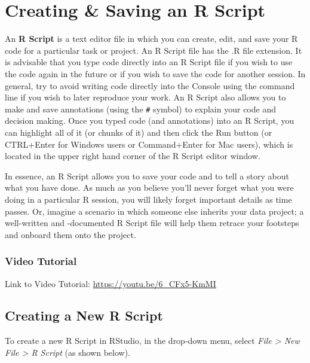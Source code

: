 \documentclass[]{book}
\begin{document}
\hypertarget{createRscript}{\section{Creating \& Saving an R
Script}\label{createRscript}}

An \textbf{R Script} is a text editor file in which you can create,
edit, and save your R code for a particular task or project. An R Script
file has the .R file extension. It is advisable that you type code
directly into an R Script file if you wish to use the code again in the
future or if you wish to save the code for another session. In general,
try to avoid writing code directly into the Console using the command
line if you wish to later reproduce your work. An R Script also allows
you to make and save annotations (using the \texttt{\#} symbol) to
explain your code and decision making. Once you typed code (and
annotations) into an R Script, you can highlight all of it (or chunks of
it) and then click the Run button (or CTRL+Enter for Windows users or
Command+Enter for Mac users), which is located in the upper right hand
corner of the R Script editor window.

In essence, an R Script allows you to save your code and to tell a story
about what you have done. As much as you believe you'll never forget
what you were doing in a particular R session, you will likely forget
important details as time passes. Or, imagine a scenario in which
someone else inherits your data project; a well-written and -documented
R Script file will help them retrace your footsteps and onboard them
onto the project.

\subsubsection{Video Tutorial}\label{video-tutorial-2}

Link to Video Tutorial: \url{https://youtu.be/6_CFx5-KmMI}

\subsection{Creating a New R Script}\label{creating-a-new-r-script}

To create a new R Script in RStudio, in the drop-down menu, select
\emph{File \textgreater{} New File \textgreater{} R Script} (as shown
below).
\end{document}
